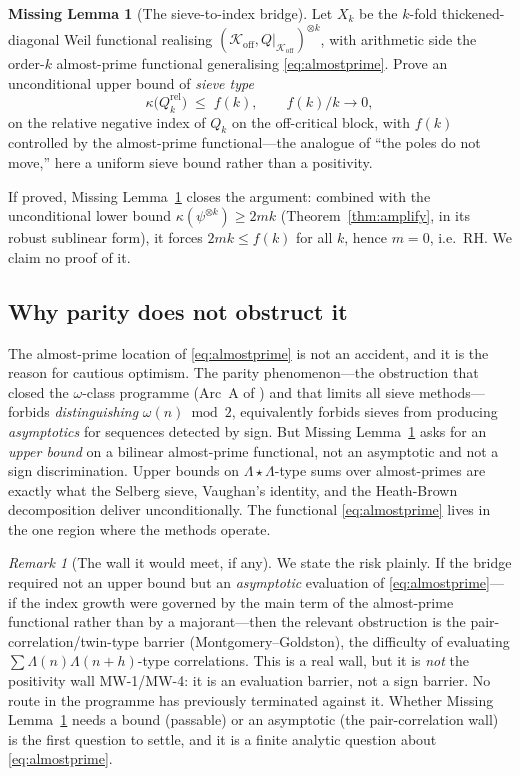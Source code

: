 \documentclass[11pt]{amsart}
\theoremstyle{definition}
\newtheorem{missinglemma}[theorem]{Missing Lemma}
\theoremstyle{remark}
\newtheorem{remark}[theorem]{Remark}
\newcommand{\Koff}{\mathcal{K}_{\mathrm{off}}}
\newcommand{\La}{\Lambda}
\begin{document}
\begin{missinglemma}[The sieve-to-index bridge]\label{ml:bridge}
Let $X_k$ be the $k$-fold thickened-diagonal Weil functional realising
$(\Koff,Q|_{\Koff})^{\otimes k}$, with arithmetic side the order-$k$
almost-prime functional generalising \eqref{eq:almostprime}. Prove an
unconditional upper bound of \emph{sieve type}
\[
\kappa\bigl(Q_k^{\mathrm{rel}}\bigr)\;\le\;f(k),\qquad f(k)/k\to0,
\]
on the relative negative index of $Q_k$ on the off-critical block, with
$f(k)$ controlled by the almost-prime functional---the analogue of
``the poles do not move,'' here a uniform sieve bound rather than a
positivity.
\end{missinglemma}

If proved, Missing Lemma~\ref{ml:bridge} closes the argument: combined with
the unconditional lower bound $\kappa(\psi^{\otimes k})\ge2mk$
(Theorem~\ref{thm:amplify}, in its robust sublinear form), it forces
$2mk\le f(k)$ for all $k$, hence $m=0$, i.e.\ RH. We claim no proof of it.

\subsection{Why parity does not obstruct it}
The almost-prime location of \eqref{eq:almostprime} is not an accident, and
it is the reason for cautious optimism. The parity phenomenon---the
obstruction that closed the $\omega$-class programme (Arc~A of \cite{P40})
and that limits all sieve methods---forbids \emph{distinguishing}
$\omega(n)\bmod2$, equivalently forbids sieves from producing
\emph{asymptotics} for sequences detected by sign. But Missing
Lemma~\ref{ml:bridge} asks for an \emph{upper bound} on a bilinear
almost-prime functional, not an asymptotic and not a sign discrimination.
Upper bounds on $\La\star\La$-type sums over almost-primes are exactly what
the Selberg sieve, Vaughan's identity, and the Heath-Brown decomposition
deliver unconditionally. The functional \eqref{eq:almostprime} lives in the
one region where the methods operate.

\begin{remark}[The wall it would meet, if any]
We state the risk plainly. If the bridge required not an upper bound but an
\emph{asymptotic} evaluation of \eqref{eq:almostprime}---if the index growth
were governed by the main term of the almost-prime functional rather than by
a majorant---then the relevant obstruction is the pair-correlation/twin-type
barrier (Montgomery--Goldston), the difficulty of evaluating
$\sum\La(n)\La(n+h)$-type correlations. This is a real wall, but it is
\emph{not} the positivity wall MW-1/MW-4: it is an evaluation barrier, not a
sign barrier. No route in the programme has previously terminated against
it. Whether Missing Lemma~\ref{ml:bridge} needs a bound (passable) or an
asymptotic (the pair-correlation wall) is the first question to settle, and
it is a finite analytic question about \eqref{eq:almostprime}.
\end{remark}
\end{document}

